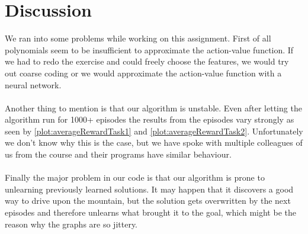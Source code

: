 \documentclass{article}
\begin{document}
	\section{Discussion}
	We ran into some problems while working on this assignment. First of all polynomials seem to be insufficient to approximate the action-value function. If we had to redo the exercise and could freely choose the features, we would try out coarse coding or we would approximate the action-value function with a neural network. \\
	\\
	Another thing to mention is that our algorithm is unstable. Even after letting the algorithm run for 1000+ episodes the results from the episodes vary strongly as seen by \autoref{plot:averageRewardTask1} and \autoref{plot:averageRewardTask2}. Unfortunately we don't know why this is the case, but we have spoke with multiple colleagues of us from the course and their programs have similar behaviour. \\
	\\
	Finally the major problem in our code is that our algorithm is prone to unlearning previously learned solutions. It may happen that it discovers a good way to drive upon the mountain, but the solution gets overwritten by the next episodes and therefore unlearns what brought it to the goal, which might be the reason why the graphs are so jittery. 
	
	
	
	
\end{document}
